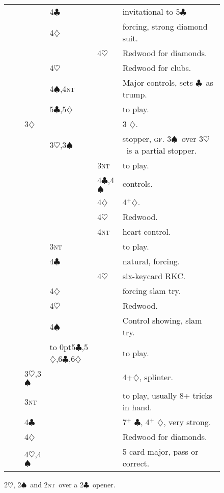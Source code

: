 \documentclass{report}
\newcommand{\gf}{\textsc{gf}}
\renewcommand{\c}{\ensuremath{\clubsuit}}
\renewcommand{\d}{\ensuremath{\diamondsuit}}
\newcommand{\h}{\ensuremath{\heartsuit}}
\newcommand{\s}{\ensuremath{\spadesuit}}
\newcommand{\nt}{\textsc{nt}}
\newcommand{\+}{\ensuremath{^+}}
\begin{document}
\begin{figure}[ht]
\begin{tabular}{llllll}
&    &    &4\c &&invitational to 5\c\\
&    &    &4\d &&forcing, strong diamond suit.\\
&    &    &    &4\h & Redwood for diamonds.\\
&    &    &4\h && Redwood for clubs.\\
&    &    &4\s,4\nt && Major controls, sets \c\ as trump.\\
&    &    &5\c,5\d&& to play.\\
&    &3\d &&& 3 \d.\\
&    &    &3\h,3\s && stopper, \gf. 3\s\ over 3\h\ is a partial stopper.\\
&    &    &    & 3\nt & to play.\\
&    &    &    & 4\c,4\s & controls.\\
&    &    &    & 4\d &4\+\d.\\
&    &    &    & 4\h & Redwood.\\
&    &    &    & 4\nt & heart control.\\
&    &    &3\nt && to play.\\
&    &    &4\c && natural, forcing.\\
&    &    &    & 4\h  & six-keycard RKC.\\
&    &    &4\d && forcing slam try.\\
&    &    &4\h && Redwood.\\
&    &    &4\s && Control showing, slam try.\\
&    &    &\hbox to 0pt{5\c,5\d,6\c,6\d\hss} && to play.\\
&    &3\h,3\s &&& 4+\d, splinter.\\
&    &3\nt &&& to play, usually 8+ tricks in hand.\\
&    &4\c &&& 7\+ \c, 4\+ \d, very strong.\\
&    &4\d &&& Redwood for diamonds.\\
&    &4\h,4\s &&& 5 card major, pass or correct.\\
\end{tabular}
\caption{2\h, 2\s\ and 2\nt\ over a 2\c\ opener.}
\end{figure}
\end{document}
